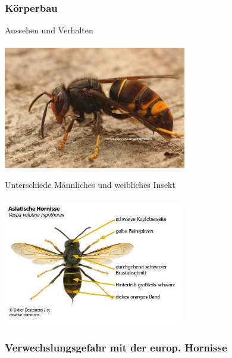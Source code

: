 \documentclass[aspectratio=169]{beamer}
\begin{document}
\subsubsection[Körperbau]{Körperbau}

\begin{frame}{Aussehen und Verhalten}
	\framesubtitle{} 
	\begin{center}	
		\includegraphics[width=0.6\textwidth]{figures/asiatische_hornisse3.jpg}
	\end{center}
\end{frame}

\begin{frame}{Unterschiede Männliches und weibliches Insekt}
	\framesubtitle{} 

	\begin{center}	
		\includegraphics[width=0.6\textwidth]{figures/Asiatische_Hornisse.JPG}
	\end{center}

	\end{frame}

\subsubsection[Verwechslungsgefahr]{Verwechslungsgefahr mit der europ. Hornisse}
\end{document}
